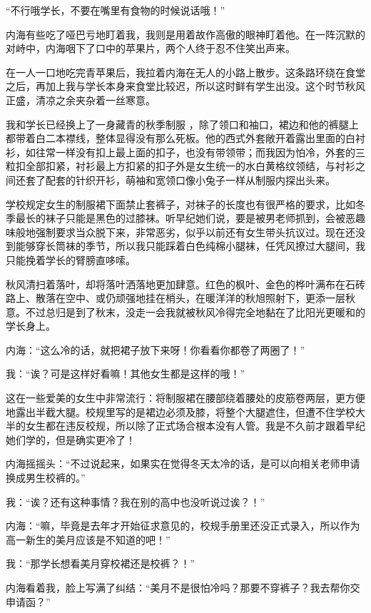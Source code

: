 “不行哦学长，不要在嘴里有食物的时候说话哦！”　　

内海有些吃了哑巴亏地盯着我，我则是用着故作高傲的眼神盯着他。在一阵沉默的对峙中，内海咽下了口中的苹果片，两个人终于忍不住笑出声来。

在一人一口地吃完青苹果后，我拉着内海在无人的小路上散步。这条路环绕在食堂之后，再加上我与学长本身来食堂比较迟，所以这时鲜有学生出没。这个时节秋风正盛，清凉之余夹杂着一丝寒意。

\newday{\maple\food\cloudy}


我和学长已经换上了一身藏青的秋季制服
，除了领口和袖口，裙边和他的裤腿上都带着白二本襟线，整体显得没有那么死板。他的西式外套敞开着露出里面的白衬衫，如往常一样没有扣上最上面的扣子，也没有带领带；而我因为怕冷，外套的三粒扣全部扣紧，衬衫最上方扣紧的扣子外是女生统一的水白黄格纹领结，与衬衫之间还套了配套的针织开衫，萌袖和宽领口像小兔子一样从制服内探出头来。

学校规定女生的制服裙下面禁止套裤子，对袜子的长度也有很严格的要求，比如冬季最长的袜子只能是黑色的过膝袜。听早纪她们说，要是被男老师抓到，会被恶趣味般地强制要求当众脱下来，非常恶劣，似乎以前还有女生带头抗议过。现在还没到能够穿长筒袜的季节，所以我只能踩着白色纯棉小腿袜，任凭风撩过大腿间，我只能挽着学长的臂膀直哆嗦。

秋风清扫着落叶，却将落叶洒落地更加肆意。红色的枫叶、金色的桦叶满布在石砖路上、散落在空中、或仍顽强地挂在梢头，在暖洋洋的秋旭照射下，更添一层秋意。不过总归是到了秋末，没走一会我就被秋风冷得完全地黏在了比阳光更暖和的学长身上。

内海：“这么冷的话，就把裙子放下来呀！你看看你都卷了两圈了！”

我：“诶？可是这样好看嘛！其他女生都是这样的哦！”

这在一些爱美的女生中非常流行：将制服裙在腰部绕着腰处的皮筋卷两层，更方便地露出半截大腿。校规里写的是裙边必须及膝，将整个大腿遮住，但遭不住学校大半的女生都在违反校规，所以除了正式场合根本没有人管。我是不久前才跟着早纪她们学的，但是确实更冷了！

内海摇摇头：“不过说起来，如果实在觉得冬天太冷的话，是可以向相关老师申请换成男生校裤的。”

我：“诶？还有这种事情？我在别的高中也没听说过诶？！”

内海：“嘛，毕竟是去年才开始征求意见的，校规手册里还没正式录入，所以作为高一新生的美月应该是不知道的吧！”

我：“那学长想看美月穿校裙还是校裤？！”

内海看着我，脸上写满了纠结：“美月不是很怕冷吗？那要不穿裤子？我去帮你交申请函？”


